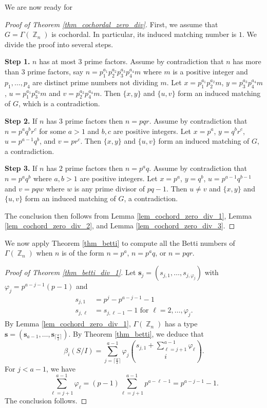 \documentclass[12pt,amscd]{amsart}
\theoremstyle{definition}
\numberwithin{equation}{section}
\DeclareMathOperator{\ZZ}{\mathbb {Z}}
\def\s {\mathbf s}
\begin{document}
We are now ready for 
\begin{proof}[Proof of Theorem \ref{thm_cochordal_zero_div}] First, we assume that $G = \Gamma(\ZZ_n)$ is cochordal. In particular, its induced matching number is $1$. We divide the proof into several steps.

\smallskip

\noindent \textbf{Step 1.} $n$ has at most $3$ prime factors. Assume by contradiction that $n$ has more than $3$ prime factors, say $n = p_1^{a_1}p_2^{a_2} p_3^{a_3} p_4^{a_4} m$ where $m$ is a positive integer and $p_1,\ldots,p_4$ are distinct prime numbers not dividing $m$. Let $x = p_1^{a_1}p_2^{a_2} m$, $y = p_3^{a_3}p_4^{a_4} m$, $u = p_1^{a_1} p_3^{a_3} m$ and $v = p_2^{a_2} p_4^{a_4} m$. Then $\{x,y\}$ and $\{u,v\}$ form an induced matching of $G$, which is a contradiction.

\smallskip

\noindent \textbf{Step 2.} If $n$ has $3$ prime factors then $n = pqr$. Assume by contradiction that $n = p^a q^b r^c$ for some $a > 1$ and $b,c$ are positive integers. Let $x = p^a$, $y = q^br^c$, $u = p^{a-1} q^b$, and $v = p r^c$. Then $\{x,y\}$ and $\{u,v\}$ form an induced matching of $G$, a contradiction.

\smallskip

\noindent \textbf{Step 3.} If $n$ has $2$ prime factors then $n = p^a q$. Assume by contradiction that $n = p^a q^b$ where $a,b > 1$ are positive integers. Let $x = p^a$, $y = q^b$, $u = p^{a-1} q^{b-1}$ and $v = pq w$ where $w$ is any prime divisor of $pq-1$. Then $u \neq v$ and $\{x,y\}$ and $\{u,v\}$ form an induced matching of $G$, a contradiction.  

The conclusion then follows from Lemma \ref{lem_cochord_zero_div_1}, Lemma \ref{lem_cochord_zero_div_2}, and Lemma \ref{lem_cochord_zero_div_3}.
\end{proof}

We now apply Theorem \ref{thm_betti} to compute all the Betti numbers of $\Gamma(\ZZ_n)$ when $n$ is of the form $n = p^a$, $n = p^aq$, or $n = pqr$.

\begin{proof}[Proof of Theorem \ref{thm_betti_div_1}]
    Let $\s_j = (s_{j,1}, \ldots, s_{j,\varphi_j})$ with $\varphi_j = p^{a-j-1}(p-1)$ and     \begin{align*}
        s_{j,1} & = p^j - p^{a-j-1} - 1 \\
        s_{j,\ell} & = s_{j,\ell-1} - 1 \text{ for } \ell = 2, \ldots, \varphi_j.
    \end{align*} 
    By Lemma \ref{lem_cochord_zero_div_1}, $\Gamma(\ZZ_n)$ has a type $\s = (\s_{a-1}, \ldots, \s_{\lceil \frac{a}{2} \rceil })$. By Theorem \ref{thm_betti}, we deduce that 
    $$\beta_i(S/I) = \sum_{j= \lceil \frac{a}{2} \rceil}^{a-1} \varphi_j \binom{s_{j,1} + \sum_{\ell = j+1}^{a-1} \varphi_\ell}{i}.$$
    For $j < a-1$, we have 
    \begin{equation}\label{eq_sum}
        \sum_{\ell = j+1}^{a-1} \varphi_\ell = (p-1) \sum_{\ell = j+1}^{a-1} p^{a-\ell - 1} = p^{a-j-1} - 1.
    \end{equation}
    The conclusion follows.
\end{proof}
\end{document}
